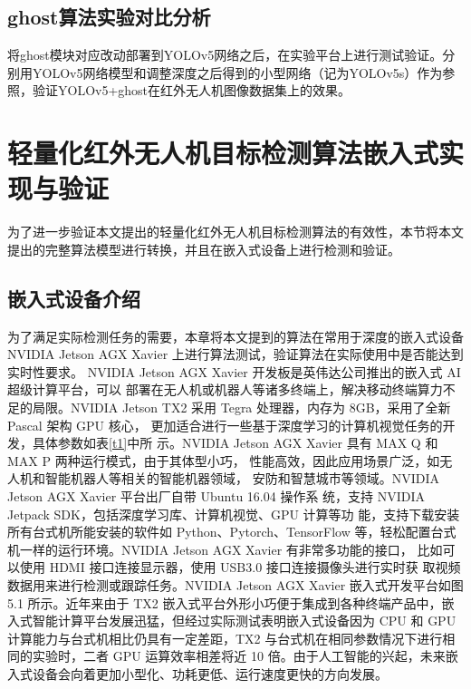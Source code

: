 \subsection{ghost算法实验对比分析}
将ghost模块对应改动部署到YOLOv5网络之后，在实验平台上进行测试验证。分别用YOLOv5网络模型和调整深度之后得到的小型网络（记为YOLOv5s）作为参照，验证YOLOv5+ghost在红外无人机图像数据集上的效果。

\section{轻量化红外无人机目标检测算法嵌入式实现与验证}
为了进一步验证本文提出的轻量化红外无人机目标检测算法的有效性，本节将本文提出的完整算法模型进行转换，并且在嵌入式设备上进行检测和验证。

\subsection{嵌入式设备介绍}
为了满足实际检测任务的需要，本章将本文提到的算法在常用于深度的嵌入式设备 NVIDIA
Jetson AGX Xavier 上进行算法测试，验证算法在实际使用中是否能达到实时性要求。
NVIDIA Jetson AGX Xavier 开发板是英伟达公司推出的嵌入式 AI 超级计算平台，可以
部署在无人机或机器人等诸多终端上，解决移动终端算力不足的局限。NVIDIA
Jetson TX2 采用 Tegra 处理器，内存为 8GB，采用了全新 Pascal 架构 GPU 核心，
更加适合进行一些基于深度学习的计算机视觉任务的开发，具体参数如表\ref{t1}中所
示。NVIDIA Jetson AGX Xavier 具有 MAX Q 和 MAX P 两种运行模式，由于其体型小巧，
性能高效，因此应用场景广泛，如无人机和智能机器人等相关的智能机器领域，
安防和智慧城市等领域。NVIDIA Jetson AGX Xavier 平台出厂自带 Ubuntu 16.04 操作系
统，支持 NVIDIA Jetpack SDK，包括深度学习库、计算机视觉、GPU 计算等功
能，支持下载安装所有台式机所能安装的软件如 Python、Pytorch、TensorFlow
等，轻松配置台式机一样的运行环境。NVIDIA Jetson AGX Xavier 有非常多功能的接口，
比如可以使用 HDMI 接口连接显示器，使用 USB3.0 接口连接摄像头进行实时获
取视频数据用来进行检测或跟踪任务。NVIDIA Jetson AGX Xavier 嵌入式开发平台如图
5.1 所示。近年来由于 TX2 嵌入式平台外形小巧便于集成到各种终端产品中，嵌
入式智能计算平台发展迅猛，但经过实际测试表明嵌入式设备因为 CPU 和 GPU
计算能力与台式机相比仍具有一定差距，TX2 与台式机在相同参数情况下进行相
同的实验时，二者 GPU 运算效率相差将近 10 倍。由于人工智能的兴起，未来嵌
入式设备会向着更加小型化、功耗更低、运行速度更快的方向发展。

